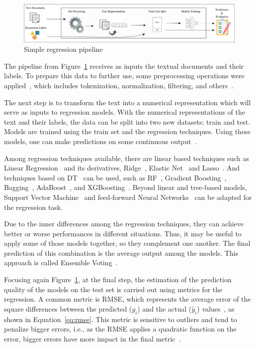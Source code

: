 \begin{figure}[htb]
    \caption{Simple regression pipeline}
    \label{fig:simple_regression}
    \includegraphics[width=\textwidth]{images/chapters/cap4_simple_pipeline_regression.pdf}
\end{figure}

The pipeline from Figure~\ref{fig:simple_regression} receives as inputs the textual documents and their labels. To prepare this data to further use, some preprocessing operations were applied~\cite{Garcia2015}, which includes tokenization, normalization, filtering, and others~\cite{Lee1999,Jurafsky2019,Kotu2019}.

The next step is to transform the text into a numerical representation which will serve as inputs to regression models. With the numerical representations of the text and their labels, the data can be split into two new datasets: train and test.
Models are trained using the train set and the regression techniques. Using these models, one can make predictions on some continuous output~\cite{Kotu2019}.

Among regression techniques available, there are linear based techniques such as Linear Regression~\cite{Hastie2009} and its derivatives, Ridge~\cite{Hoerl1970}, Elastic Net~\cite{Zou2005} and Lasso~\cite{Tibshirani1996}. And techniques based on \gls{DT}~\cite{Breiman2017} can be used, such as  \gls{RF}~\cite{Breiman2001}, Gradient Boosting~\cite{Friedman2001}, Bagging~\cite{Breiman1996}, AdaBoost~\cite{Schapire1999}, and XGBoosting~\cite{Chen2016}.
Beyond linear and tree-based models, Support Vector Machine~\cite{Drucker1997} and feed-forward Neural Networks~\cite{Kingma2015} can be adapted for the regression task.  

Due to the inner differences among the regression techniques, they can achieve better or worse performances in different situations. Thus, it may be useful to apply some of those models together, so they complement one another. The final prediction of this combination is the average output among the models. This approach is called Ensemble Voting~\cite{Mendes-Moreira2012}.


Focusing again Figure~\ref{fig:simple_regression}, at the final step, the estimation of the prediction quality  of the models on the test set  is carried out using metrics for the regression. A common metric is \gls{RMSE}, which represents the average error of the square differences between the predicted ($y_i$) and the actual ($\hat{y}_i$) values~\cite{Aggarwal2018}, as shown in Equation~\ref{eq:rmse}. This metric is sensitive to outliers and tend to penalize bigger errors, i.e., as the \gls{RMSE} applies a quadratic function on the error, bigger errors have more impact in the final metric~\cite{Chai2014}.

